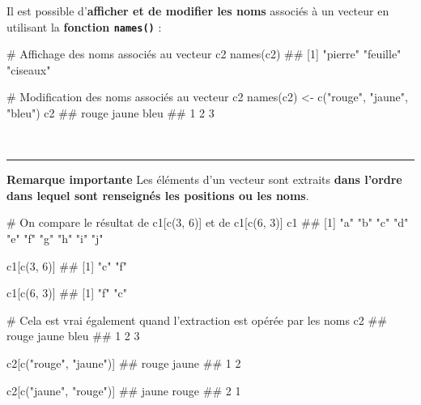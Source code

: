 \documentclass[12pt,twosided, notitlepage]{book}
\newenvironment{Shaded}{}{}
\newcommand{\KeywordTok}[1]{\textcolor[rgb]{0.00,0.00,1.00}{{#1}}}
\newcommand{\DecValTok}[1]{{#1}}
\newcommand{\StringTok}[1]{\textcolor[rgb]{0.00,0.50,0.50}{{#1}}}
\newcommand{\CommentTok}[1]{\textcolor[rgb]{0.00,0.50,0.00}{{#1}}}
\newcommand{\NormalTok}[1]{{#1}}
\renewenvironment{Shaded}{\begin{snugshade}}{\end{snugshade}}
\begin{document}
Il est possible d'\textbf{afficher et de modifier les noms} associés à
un vecteur en utilisant la \textbf{fonction
\texttt{names()}} :

\begin{Shaded}
\begin{Highlighting}[]
\CommentTok{# Affichage des noms associés au vecteur c2}
\KeywordTok{names}\NormalTok{(c2)}
  \NormalTok{## [1] "pierre"  "feuille" "ciseaux"}

\CommentTok{# Modification des noms associés au vecteur c2}
\KeywordTok{names}\NormalTok{(c2) <-}\StringTok{ }\KeywordTok{c}\NormalTok{(}\StringTok{"rouge"}\NormalTok{, }\StringTok{"jaune"}\NormalTok{, }\StringTok{"bleu"}\NormalTok{)}
\NormalTok{c2}
  \NormalTok{## rouge jaune  bleu }
  \NormalTok{##     1     2     3}
\end{Highlighting}
\end{Shaded}

~

\begin{center}\rule{0.5\linewidth}{\linethickness}\end{center}

\textbf{Remarque importante} Les éléments d'un vecteur sont extraits
\textbf{dans l'ordre dans lequel sont renseignés les positions ou les
noms}.

\begin{Shaded}
\begin{Highlighting}[]
\CommentTok{# On compare le résultat de c1[c(3, 6)] et de c1[c(6, 3)]}
\NormalTok{c1}
  \NormalTok{##  [1] "a" "b" "c" "d" "e" "f" "g" "h" "i" "j"}

\NormalTok{c1[}\KeywordTok{c}\NormalTok{(}\DecValTok{3}\NormalTok{, }\DecValTok{6}\NormalTok{)]}
  \NormalTok{## [1] "c" "f"}

\NormalTok{c1[}\KeywordTok{c}\NormalTok{(}\DecValTok{6}\NormalTok{, }\DecValTok{3}\NormalTok{)]}
  \NormalTok{## [1] "f" "c"}

\CommentTok{# Cela est vrai également quand l'extraction est opérée par les noms}
\NormalTok{c2}
  \NormalTok{## rouge jaune  bleu }
  \NormalTok{##     1     2     3}

\NormalTok{c2[}\KeywordTok{c}\NormalTok{(}\StringTok{"rouge"}\NormalTok{, }\StringTok{"jaune"}\NormalTok{)]}
  \NormalTok{## rouge jaune }
  \NormalTok{##     1     2}

\NormalTok{c2[}\KeywordTok{c}\NormalTok{(}\StringTok{"jaune"}\NormalTok{, }\StringTok{"rouge"}\NormalTok{)]}
  \NormalTok{## jaune rouge }
  \NormalTok{##     2     1}
\end{Highlighting}
\end{Shaded}
\end{document}
